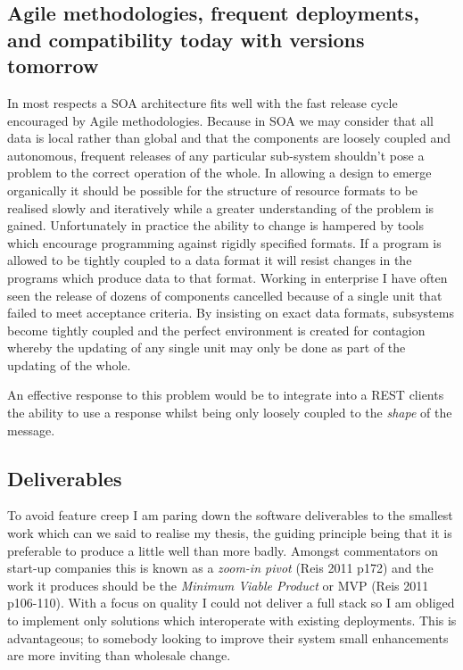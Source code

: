 \documentclass[]{article}
\begin{document}
\subsection{Agile methodologies, frequent deployments, and compatibility
today with versions tomorrow}

In most respects a SOA architecture fits well with the fast release
cycle encouraged by Agile methodologies. Because in SOA we may consider
that all data is local rather than global and that the components are
loosely coupled and autonomous, frequent releases of any particular
sub-system shouldn't pose a problem to the correct operation of the
whole. In allowing a design to emerge organically it should be possible
for the structure of resource formats to be realised slowly and
iteratively while a greater understanding of the problem is gained.
Unfortunately in practice the ability to change is hampered by tools
which encourage programming against rigidly specified formats. If a
program is allowed to be tightly coupled to a data format it will resist
changes in the programs which produce data to that format. Working in
enterprise I have often seen the release of dozens of components
cancelled because of a single unit that failed to meet acceptance
criteria. By insisting on exact data formats, subsystems become tightly
coupled and the perfect environment is created for contagion whereby the
updating of any single unit may only be done as part of the updating of
the whole.

An effective response to this problem would be to integrate into a REST
clients the ability to use a response whilst being only loosely coupled
to the \emph{shape} of the message.

\subsection{Deliverables}

To avoid feature creep I am paring down the software deliverables to the
smallest work which can we said to realise my thesis, the guiding
principle being that it is preferable to produce a little well than more
badly. Amongst commentators on start-up companies this is known as a
\emph{zoom-in pivot} (Reis 2011 p172) and the work it produces should be
the \emph{Minimum Viable Product} or MVP (Reis 2011 p106-110). With a
focus on quality I could not deliver a full stack so I am obliged to
implement only solutions which interoperate with existing deployments.
This is advantageous; to somebody looking to improve their system small
enhancements are more inviting than wholesale change.
\end{document}
